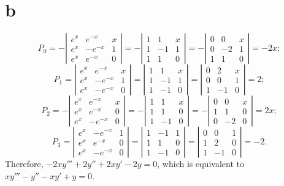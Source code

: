 \documentclass[dvips]{book}
\numberwithin{example}{section}
\numberwithin{equation}{section}
\numberwithin{theorem}{section}
\numberwithin{table}{section}
\numberwithin{figure}{section}
\begin{document}
\part{b}
$$
P_0=-
\left|\begin{array}{crc}
e^x&e^{-x}&x\\
e^x&-e^{-x}&1\\
e^x&e^{-x}&0
\end{array}\right|=
-\left|\begin{array}{crc}
1&1&x\\1&-1&1\\1&1&0
\end{array}\right|=
-\left|\begin{array}{crc}
0&0&x\\0&-2&1\\1&1&0
\end{array}\right|=-2x;
$$
$$
P_1=
\left|\begin{array}{crc}
e^x&e^{-x}&x\\e^x&-e^{-x}&1\\e^x&-e^{-x}&0
\end{array}\right|=
\left|\begin{array}{crc}
1&1&x\\1&-1&1\\1&-1&0
\end{array}\right|=
\left|\begin{array}{crc}
0&2&x\\0&0&1\\1&-1&0
\end{array}\right|=2;
$$
$$
P_2=
-\left|\begin{array}{crc}
e^x&e^{-x}&x\\e^x&e^{-x}&0\\e^x&-e^{-x}&0
\end{array}\right|=
-\left|\begin{array}{crc}
1&1&x\\1&1&0\\1&-1&0
\end{array}\right|=
-\left|\begin{array}{crc}
0&0&x\\1&1&0\\0&-2&0
\end{array}\right|=2x;
$$
$$
P_3=
\left|\begin{array}{crc}
e^x&-e^{-x}&1\\e^x&e^{-x}&0\\e^x&-e^{-x}&0
\end{array}\right|=
\left|\begin{array}{crc}
1&-1&1\\1&1&0\\1&-1&0
\end{array}\right|=
\left|\begin{array}{crc}
0&0&1\\1&2&0\\1&-1&0
\end{array}\right|=-2.
$$
Therefore,
$-2xy'''+2y''+2xy'-2y=0$,
which is equivalent to
$xy'''-y''-xy'+y=0$.
\end{document}
